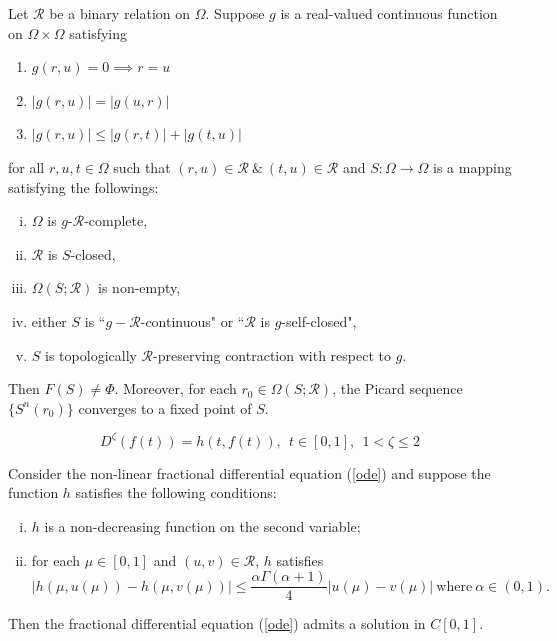 \documentclass[10pt,a4paper]{amsart}
\begin{document}
\begin{theorem}\label{main thm}
	 Let $\mathcal{R}$ be a binary relation on   $ \Omega $.  Suppose $ g  $  is a real-valued continuous	function on $ \Omega \times \Omega $ satisfying 
	 \begin{enumerate}[(g1)]
	 	\item $ g ( r, u ) = 0 \implies r = u $ 
	 	\item $ | g ( r, u ) | = | g ( u, r ) | $ 
	 	\item $ |g( r, u )| \leq |g(r, t ) | + | g ( t, u ) | $
	 \end{enumerate}  
     
 for all $ r, u, t  \in \Omega $ such that $ ( r, u ) \in \mathcal{R} ~ \& ~ ( t, u ) \in \mathcal{R} $   and $ S : \Omega \to \Omega $ is a mapping satisfying the followings:  
	\begin{enumerate}[(i)]
		\item $ \Omega$ is $g$-$\mathcal{R}$-complete,
		\item $\mathcal{R}$ is $ S $-closed,
		\item $ \Omega ( S;\mathcal{R})$ is non-empty,
		\item either $ S$ is ``$g-\mathcal{R}$-continuous" or ``$\mathcal{R}$ is $g$-self-closed",
		\item $ S $ is topologically $\mathcal{R}$-preserving contraction with respect to $g$.\label{iii} 
	\end{enumerate} 
    
	Then $ F (  S ) \neq \Phi $. Moreover, for each $r_0\in \Omega ( S ;\mathcal{R})$, the Picard sequence $ \{ S^n(r_0) \} $   converges to a fixed point of $S$.     
\end{theorem}

\begin{equation}\label{ode}
		D^\zeta ( f ( t ) ) = h ( t, f ( t ) ), ~~  t \in [ 0, 1 ], ~~ 1 <  \zeta \leq 2
\end{equation}

\begin{theorem}
	Consider the non-linear fractional differential equation (\ref{ode}) and suppose the function $h$ satisfies the following conditions:
	\begin{enumerate}[(i)]
		\item $ h $ is a non-decreasing function on the second variable;
		\item for each $ \mu \in [ 0, 1 ] $ and $ ( u, v ) \in \mathcal{R} $, $ h $ satisfies 
		$$ | h ( \mu, u ( \mu ) ) - h ( \mu, v ( \mu ) ) | \leq \frac{\alpha \Gamma ( \alpha + 1 ) }{4} | u ( \mu ) - v( \mu ) | ~ \text{where} ~ \alpha \in ( 0, 1 ).  $$
	\end{enumerate}
Then   the fractional differential equation (\ref{ode}) admits a solution in $C[0,1] $.
\end{theorem}
\end{document}
